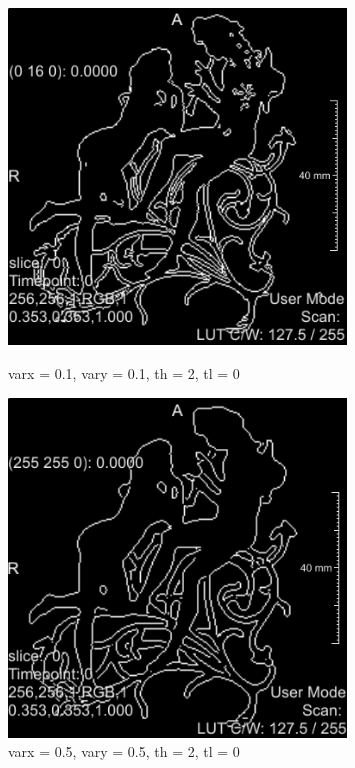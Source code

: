 \documentclass{article}
\begin{document}
\begin{figure}[ht]
\centering
\begin{minipage}{.5\textwidth}
  \centering
  \includegraphics[width=0.8\textwidth]{4sintesis/cannyvar01.png}
  \caption{varx = 0.1, vary = 0.1, th = 2, tl = 0}
\label{fg:cannyvar01}
\end{minipage}%
\begin{minipage}{.5\textwidth}
  \centering
  \includegraphics[width=0.8\textwidth]{4sintesis/cannyvar05.png}
  \caption{varx = 0.5, vary = 0.5, th = 2, tl = 0}
\label{fg:cannyvar05}
\end{minipage}
\end{figure}
\FloatBarrier
\end{document}
